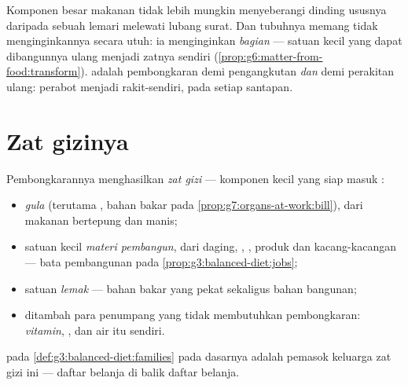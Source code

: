 \begin{remark}\label{rem:g7:digestion-and-nutrients:why}
Komponen besar makanan tidak lebih mungkin menyeberangi dinding
ususnya daripada sebuah lemari melewati lubang surat. Dan tubuhnya
memang tidak menginginkannya secara utuh: ia menginginkan
\emph{bagian} --- satuan kecil yang dapat dibangunnya ulang menjadi
zatnya sendiri
(\cref{prop:g6:matter-from-food:transform}).  adalah
pembongkaran demi pengangkutan \emph{dan} demi perakitan ulang: perabot
menjadi rakit-sendiri, pada setiap santapan.
\end{remark}

\section{Zat gizinya}

\begin{definition}\label{def:g7:digestion-and-nutrients:families}
Pembongkarannya menghasilkan \emph{zat gizi} ---
komponen kecil yang siap masuk :
\begin{itemize}
  \item \emph{gula} (terutama , bahan bakar pada
        \cref{prop:g7:organs-at-work:bill}), dari makanan bertepung
        dan manis;
  \item satuan kecil \emph{materi pembangun}, dari daging, ,
        , produk  dan kacang-kacangan --- bata pembangunan
        pada \cref{prop:g3:balanced-diet:jobs};
  \item satuan \emph{lemak} --- bahan bakar yang pekat sekaligus bahan
        bangunan;
  \item ditambah para penumpang yang tidak membutuhkan pembongkaran:
        \emph{vitamin}, \emph{}, dan air itu sendiri.
\end{itemize}
 pada \cref{def:g3:balanced-diet:families} pada
dasarnya adalah pemasok keluarga zat gizi ini --- daftar belanja di
balik daftar belanja.
\end{definition}

